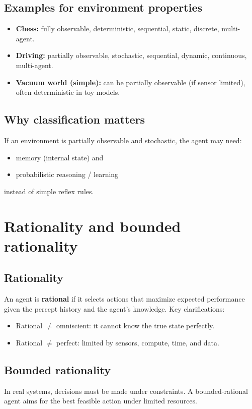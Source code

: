 \documentclass[11pt]{article}
\begin{document}
\subsection{Examples for environment properties}
\begin{itemize}[leftmargin=*]
  \item \textbf{Chess:} fully observable, deterministic, sequential, static, discrete, multi-agent.
  \item \textbf{Driving:} partially observable, stochastic, sequential, dynamic, continuous, multi-agent.
  \item \textbf{Vacuum world (simple):} can be partially observable (if sensor limited), often deterministic in toy models.
\end{itemize}

\subsection{Why classification matters}
If an environment is partially observable and stochastic, the agent may need:
\begin{itemize}[leftmargin=*]
  \item memory (internal state) and
  \item probabilistic reasoning / learning
\end{itemize}
instead of simple reflex rules.

\section{Rationality and bounded rationality}
\subsection{Rationality}
An agent is \textbf{rational} if it selects actions that maximize expected performance given the percept history and the agent's knowledge.
Key clarifications:
\begin{itemize}[leftmargin=*]
  \item Rational $\neq$ omniscient: it cannot know the true state perfectly.
  \item Rational $\neq$ perfect: limited by sensors, compute, time, and data.
\end{itemize}

\subsection{Bounded rationality}
In real systems, decisions must be made under constraints. A bounded-rational agent aims for the best feasible action under limited resources.
\end{document}

